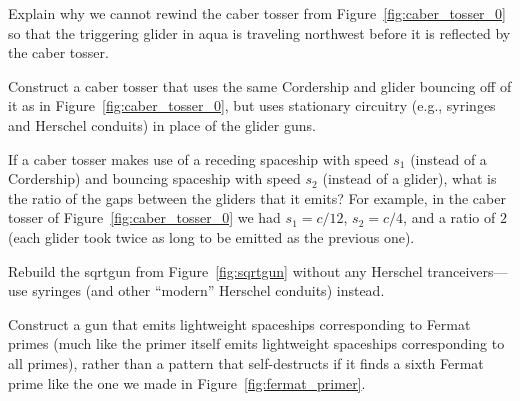 \begin{multicols}{2}
\mfilbreak


\begin{problem}\label{exer:caber_tosser_rewind}
	Explain why we cannot rewind the caber tosser from Figure~\ref{fig:caber_tosser_0} so that the triggering glider in aqua is traveling northwest before it is reflected by the caber tosser.
\end{problem}


\mfilbreak


\begin{problem}\label{exer:caber_tosser_stationary}
	Construct a caber tosser that uses the same Cordership and glider bouncing off of it as in Figure~\ref{fig:caber_tosser_0}, but uses stationary circuitry (e.g., syringes and Herschel conduits) in place of the glider guns.
\end{problem}


\mfilbreak


\begin{problem}\label{exer:caber_tosser_different_speeds}
	If a caber tosser makes use of a receding spaceship with speed $s_1$ (instead of a Cordership) and bouncing spaceship with speed $s_2$ (instead of a glider), what is the ratio of the gaps between the gliders that it emits? For example, in the caber tosser of Figure~\ref{fig:caber_tosser_0} we had $s_1 = c/12$, $s_2 = c/4$, and a ratio of $2$ (each glider took twice as long to be emitted as the previous one).
\end{problem}


\mfilbreak


\begin{problem}\label{exer:sqrtgun_standard}
	Rebuild the sqrtgun from Figure~\ref{fig:sqrtgun} without any Herschel tranceivers---use syringes (and other ``modern'' Herschel conduits) instead.
\end{problem}


\mfilbreak


\begin{problem}\label{exer:construct_fermat_primer}
	Construct a gun that emits lightweight spaceships corresponding to Fermat primes (much like the primer itself emits lightweight spaceships corresponding to all primes), rather than a pattern that self-destructs if it finds a sixth Fermat prime like the one we made in Figure~\ref{fig:fermat_primer}.
\end{problem}




\mfilbreak



\end{multicols}
